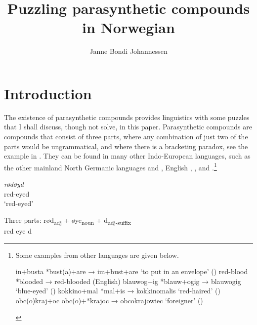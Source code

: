 \documentclass[output=paper]{LSP/langsci}
\author{Janne Bondi Johannessen\affiliation{MultiLing, Department of Linguistics and Scandinavian Studies, 
University of Oslo
}}
\title{Puzzling parasynthetic compounds in Norwegian}
\begin{document}
 

 

 

 

 






\section{Introduction}\label{sec:bondi:1}


The existence of parasynthetic compounds  provides linguistics with some puzzles that I shall discuss, though not solve, in this paper.  Parasynthetic compounds are compounds that consist of three parts, where  any combination of just two of the parts would be ungrammatical, and where there is a bracketing paradox, see the  example in . They can be found in many other Indo-European languages, such as the other mainland North Germanic languages  \citep{TelemanEtAl1999} and   \citep{Hansen2011}, English \citep{Hirtle1970}, ,  and  \citep{MelloniBisetto2010}.\footnote{Some examples from other languages are given below.
\begin{exe}
\ex *in+busta *bust(a)+are → im+bust+are \upshape`to put in an envelope’     ()
\ex *red-blood *blooded → red-blooded     \upshape    (English)
\ex *blauwog+ig *blauw+ogig → blauwogig \upshape `blue-eyed’     ()
\ex *kokkino+mal *mal+is → kokkinomalis \upshape `red-haired’     ()
\ex   *obc(o)kraj+oc obc(o)+*krajoc → obcokrajowiec \upshape `foreigner’   () \citep[199--201]{MelloniBisetto2010}
\end{exe}}

\ea%
    \label{ex:1}
\ea
 
\textit{rødøyd}\\
red-eyed\\
`red-eyed’

\ex
 \gll \textup{Three parts:} rød\textsubscript{\textup{adj}} + øye\textsubscript{\textup{noun}} +   d\textsubscript{\textup{adj-suffix}}\\
 {} red {} eye {}         d\\
\end{document}
